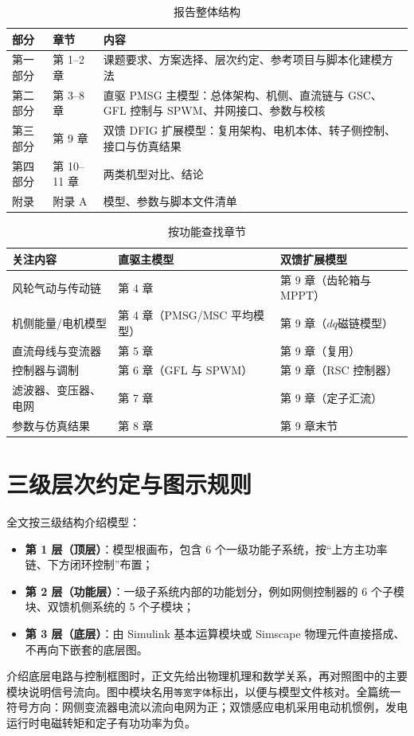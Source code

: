 \documentclass[UTF8,zihao=-4,fontset=none]{ctexrep}
\begin{document}
\begin{table}[H]
\centering
\caption{报告整体结构}
\label{tab:roadmap}
\begin{tabular}{p{2.6cm}p{3.2cm}p{7.0cm}}
\toprule
部分 & 章节 & 内容\\
\midrule
第一部分 & 第 1--2 章 & 课题要求、方案选择、层次约定、参考项目与脚本化建模方法\\
第二部分 & 第 3--8 章 & 直驱 PMSG 主模型：总体架构、机侧、直流链与 GSC、GFL 控制与 SPWM、并网接口、参数与校核\\
第三部分 & 第 9 章 & 双馈 DFIG 扩展模型：复用架构、电机本体、转子侧控制、接口与仿真结果\\
第四部分 & 第 10--11 章 & 两类机型对比、结论\\
附录 & 附录 A & 模型、参数与脚本文件清单\\
\bottomrule
\end{tabular}
\end{table}

\begin{table}[H]
\centering
\caption{按功能查找章节}
\label{tab:locator}
\begin{tabular}{p{4.6cm}p{4.2cm}p{4.0cm}}
\toprule
关注内容 & 直驱主模型 & 双馈扩展模型\\
\midrule
风轮气动与传动链 & 第 4 章 & 第 9 章（齿轮箱与 MPPT）\\
机侧能量/电机模型 & 第 4 章（PMSG/MSC 平均模型） & 第 9 章（\(dq\)磁链模型）\\
直流母线与变流器 & 第 5 章 & 第 9 章（复用）\\
控制器与调制 & 第 6 章（GFL 与 SPWM） & 第 9 章（RSC 控制器）\\
滤波器、变压器、电网 & 第 7 章 & 第 9 章（定子汇流）\\
参数与仿真结果 & 第 8 章 & 第 9 章末节\\
\bottomrule
\end{tabular}
\end{table}

\section{三级层次约定与图示规则}
全文按三级结构介绍模型：
\begin{itemize}
  \item \textbf{第 1 层（顶层）}：模型根画布，包含 6 个一级功能子系统，按“上方主功率链、下方闭环控制”布置；
  \item \textbf{第 2 层（功能层）}：一级子系统内部的功能划分，例如网侧控制器的 6 个子模块、双馈机侧系统的 5 个子模块；
  \item \textbf{第 3 层（底层）}：由 Simulink 基本运算模块或 Simscape 物理元件直接搭成、不再向下嵌套的底层图。
\end{itemize}
介绍底层电路与控制框图时，正文先给出物理机理和数学关系，再对照图中的主要模块说明信号流向。图中模块名用\texttt{等宽字体}标出，以便与模型文件核对。全篇统一符号方向：网侧变流器电流以流向电网为正；双馈感应电机采用电动机惯例，发电运行时电磁转矩和定子有功功率为负。
\end{document}

